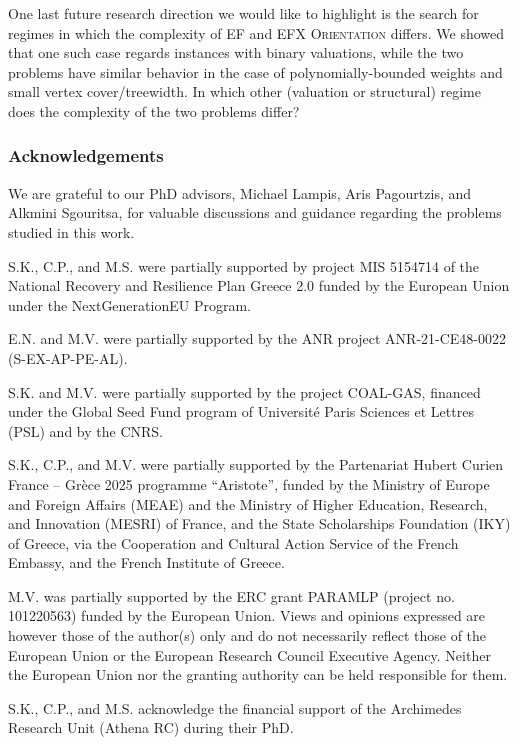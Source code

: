 \documentclass[11pt,letterpaper]{article}
\begin{document}
One last future research direction we would like to highlight is the search for regimes in which the complexity of EF and EFX \textsc{Orientation} differs.
We showed that one such case regards instances with binary valuations, while the two problems have similar behavior in the case of
polynomially-bounded weights and small vertex cover/treewidth.
In which other (valuation or structural) regime does the complexity of the two problems differ?



\subsubsection*{Acknowledgements}

We are grateful to our PhD advisors, Michael Lampis, Aris Pagourtzis, and Alkmini Sgouritsa, for valuable discussions and guidance regarding the problems studied in this work.

S.K., C.P., and M.S. were partially supported by project MIS 5154714 of the National Recovery and Resilience Plan Greece 2.0 funded by the European Union under the NextGenerationEU Program.


E.N. and M.V. were partially supported by the ANR project ANR-21-CE48-0022 (S-EX-AP-PE-AL).


S.K. and M.V. were partially supported by the project COAL-GAS,
financed under the Global Seed Fund program of Université Paris Sciences et Lettres (PSL) and by the CNRS.


S.K., C.P., and M.V. were partially supported by the Partenariat Hubert Curien France – Grèce 2025 programme ``Aristote'', funded by the Ministry of Europe and Foreign Affairs (MEAE) and the Ministry of Higher Education, Research, and Innovation (MESRI) of France, and the State Scholarships Foundation (IKY) of Greece, via the Cooperation and Cultural Action Service of the French Embassy, and the French Institute of Greece.

M.V. was partially supported by the ERC grant PARAMLP (project no. 101220563) funded by the European Union.
Views and opinions expressed are however those of the author(s) only and do not necessarily reflect those of the European Union or the European Research Council Executive Agency. Neither the European Union nor the granting authority can be held responsible for them.

S.K., C.P., and M.S. acknowledge the financial support of the Archimedes Research Unit (Athena RC) during their PhD.
\end{document}
